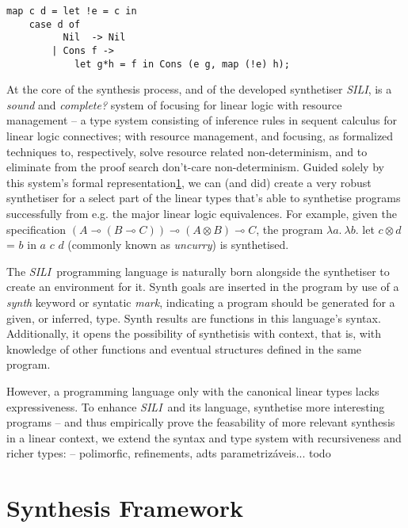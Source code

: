 \documentclass{llncs}
\newcommand{\lolli}{\multimap}
\newcommand{\tensor}{\otimes}
\newcommand{\synname}{\emph{SILI}}
\begin{document}
\begin{verbatim}
map c d = let !e = c in
    case d of
          Nil  -> Nil
        | Cons f ->
            let g*h = f in Cons (e g, map (!e) h);
\end{verbatim}


At the core of the synthesis process, and of the developed synthetiser \synname,
is a \emph{sound} and \emph{complete?} system of focusing for linear logic with
resource management -- a type system consisting of inference rules in sequent
calculus for linear logic connectives; with resource management, and focusing,
as formalized techniques to, respectively, solve resource related
non-determinism, and to eliminate from the proof search don't-care
non-determinism.  Guided solely by this system's formal
representation\ref{sec:formal_system}, we can (and did) create a very robust
synthetiser for a select part of the linear types that's able to synthetise
programs successfully from e.g. the major linear logic equivalences. For
example, given the specification $(A \lolli (B \lolli C)) \lolli (A \tensor B)
\lolli C$, the program $\lambda a .\ \lambda b .$ let $c \tensor d$ = $b$ in $a$
$c$ $d$ (commonly known as \emph{uncurry}) is synthetised.

The \synname\ programming language is naturally born alongside the synthetiser
to create an environment for it. Synth goals are inserted in the program by use
of a \emph{synth} keyword or syntatic \emph{mark}, indicating a program should
be generated for a given, or inferred, type. Synth results are functions in this
language's syntax. Additionally, it opens the possibility of synthetisis with
context, that is, with knowledge of other functions and eventual structures
defined in the same program.

However, a programming language only with the canonical linear types lacks
expressiveness. To enhance \synname\ and its language, synthetise more interesting
programs -- and thus empirically prove the feasability of more relevant
synthesis in a linear context, we extend the syntax and type system with
recursiveness and richer
types: -- polimorfic, refinements, adts parametrizáveis...  todo


\section{Synthesis Framework}\label{sec:formal_system}

\end{document}
